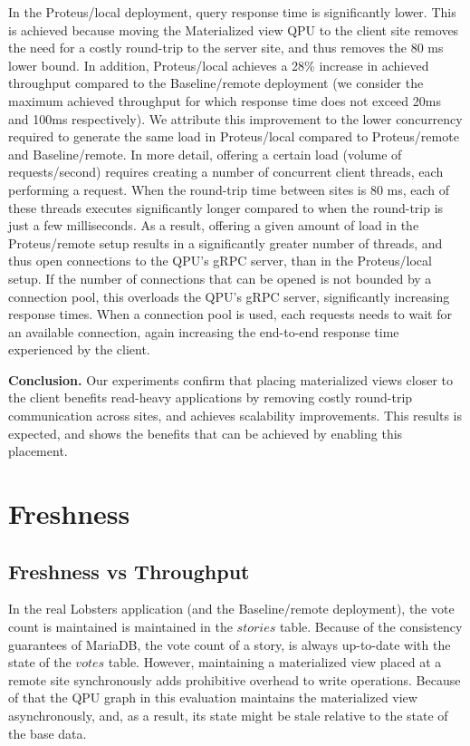 In the Proteus/local deployment, query response time is significantly lower.
This is achieved because moving the Materialized view QPU to the client site removes the need for a costly round-trip to
the server site, and thus removes the 80 ms lower bound.
In addition, Proteus/local achieves a 28\% increase in achieved throughput compared to the Baseline/remote deployment
(we consider the maximum achieved throughput for which response time does not exceed 20ms and 100ms respectively).
We attribute this improvement to the lower concurrency required to generate the same load in Proteus/local
compared to Proteus/remote and Baseline/remote.
In more detail, offering a certain load (volume of requests/second) requires creating a number of concurrent client threads,
each performing a request.
When the round-trip time between sites is 80 ms, each of these threads executes significantly longer compared to
when the round-trip is just a few milliseconds.
As a result, offering a given amount of load in the Proteus/remote setup results in a significantly greater number
of threads, and thus open connections to the QPU's gRPC server, than in the Proteus/local setup.
If the number of connections that can be opened is not bounded by a connection pool, this overloads the QPU's gRPC server,
significantly increasing response times.
When a connection pool is used, each requests needs to wait for an available connection,
again increasing the end-to-end response time experienced by the client.

\medskip
\noindent
\textbf{Conclusion.} Our experiments confirm that placing materialized views closer to the client benefits read-heavy applications
by removing costly round-trip communication across sites, and achieves scalability improvements.
This results is expected, and shows the benefits that can be achieved by enabling this placement.


\section{Freshness}
\label{sec:eval_freshness}

\subsection{Freshness vs Throughput}
\label{sec:eval_freshness_throughput}

In the real Lobsters application (and the Baseline/remote deployment),
the vote count is maintained is maintained in the $stories$ table.
Because of the consistency guarantees of MariaDB,
the vote count of a story, is always up-to-date with the state of the $votes$ table.
However, maintaining a materialized view placed at a remote site synchronously adds prohibitive overhead to write operations.
Because of that the QPU graph in this evaluation maintains the materialized view asynchronously, and, as a result,
its state might be stale relative to the state of the base data.

